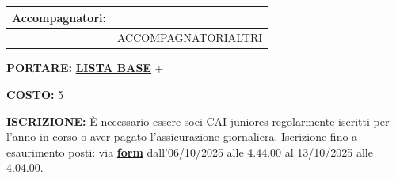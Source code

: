 \documentclass[12pt]{article}
\begin{document}
\vspace{0.3cm}

\noindent
{\small
\begin{tabular}{|p{3.5cm}|p{\dimexpr\textwidth-3.5cm-4\tabcolsep-3\arrayrulewidth\relax}|}
\hline
\rowcolor{celeste}\textbf{Accompagnatori:} & \cellcolor{arancione}{Arturo Valli} \\ 
\hline
 & {{ACCOMPAGNATORIALTRI}} \\ 
\hline
\end{tabular}
}

\vspace{0.3cm}

\noindent
{\small
\textbf{PORTARE:} \href{https://www.cairoma.it/?page_id=22206}{\textbf{LISTA BASE}} + 

\vspace{0.2cm}
\noindent
\textbf{COSTO:} 5

\vspace{0.2cm}
\noindent
\textbf{ISCRIZIONE:} È necessario essere soci CAI juniores regolarmente iscritti per l'anno in corso o aver pagato l'assicurazione giornaliera.
Iscrizione fino a esaurimento posti: via \href{}{\textbf{form}} dall'06/10/2025 alle 4.44.00 al 13/10/2025 alle 4.04.00.
}
\end{document}
